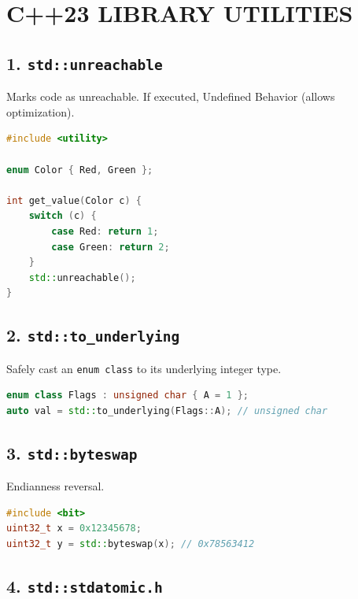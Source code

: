 \hypertarget{c23-library-utilities}{%
\chapter{C++23 LIBRARY UTILITIES}\label{c23-library-utilities}}

\hypertarget{stdunreachable}{%
\section{\texorpdfstring{1.
\texttt{std::unreachable}}{1. std::unreachable}}\label{stdunreachable}}

Marks code as unreachable. If executed, Undefined Behavior (allows
optimization).

\begin{lstlisting}[language={C++}]
#include <utility>

enum Color { Red, Green };

int get_value(Color c) {
    switch (c) {
        case Red: return 1;
        case Green: return 2;
    }
    std::unreachable();
}
\end{lstlisting}

\hypertarget{stdto_underlying}{%
\section{\texorpdfstring{2.
\texttt{std::to\_underlying}}{2. std::to\_underlying}}\label{stdto_underlying}}

Safely cast an \passthrough{\lstinline!enum class!} to its underlying
integer type.

\begin{lstlisting}[language={C++}]
enum class Flags : unsigned char { A = 1 };
auto val = std::to_underlying(Flags::A); // unsigned char
\end{lstlisting}

\hypertarget{stdbyteswap}{%
\section{\texorpdfstring{3.
\texttt{std::byteswap}}{3. std::byteswap}}\label{stdbyteswap}}

Endianness reversal.

\begin{lstlisting}[language={C++}]
#include <bit>
uint32_t x = 0x12345678;
uint32_t y = std::byteswap(x); // 0x78563412
\end{lstlisting}

\hypertarget{stdstdatomic.h}{%
\section{\texorpdfstring{4.
\texttt{std::stdatomic.h}}{4. std::stdatomic.h}}\label{stdstdatomic.h}}


